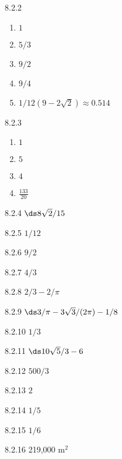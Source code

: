 \begin{Answer}{8.2.2}
\begin{enumerate}
\item {$1$}
\item {$5/3$}
\item {$9/2$}
\item {$9/4$}
\item {$1/12(9-2\sqrt{2})\approx 0.514$}
\end{enumerate}
\end{Answer}
\begin{Answer}{8.2.3}
\begin{enumerate}
\item $ 1 $
\item $ 5 $
\item $ 4 $
\item $ \frac{133}{20} $
\end{enumerate}
\end{Answer}
\begin{Answer}{8.2.4}
 $\ds 8\sqrt2/15$
\end{Answer}
\begin{Answer}{8.2.5}
 $1/12$
\end{Answer}
\begin{Answer}{8.2.6}
 $9/2$
\end{Answer}
\begin{Answer}{8.2.7}
 $4/3$
\end{Answer}
\begin{Answer}{8.2.8}
 $2/3-2/\pi$
\end{Answer}
\begin{Answer}{8.2.9}
 $\ds 3/\pi - 3\sqrt3/(2\pi)-1/8$
\end{Answer}
\begin{Answer}{8.2.10}
 $1/3$
\end{Answer}
\begin{Answer}{8.2.11}
 $\ds 10\sqrt{5}/3-6$
\end{Answer}
\begin{Answer}{8.2.12}
 $500/3$
\end{Answer}
\begin{Answer}{8.2.13}
 $2$
\end{Answer}
\begin{Answer}{8.2.14}
 $1/5$
\end{Answer}
\begin{Answer}{8.2.15}
 $1/6$
\end{Answer}
\begin{Answer}{8.2.16}
{219,000 m$^2$}
\end{Answer}
